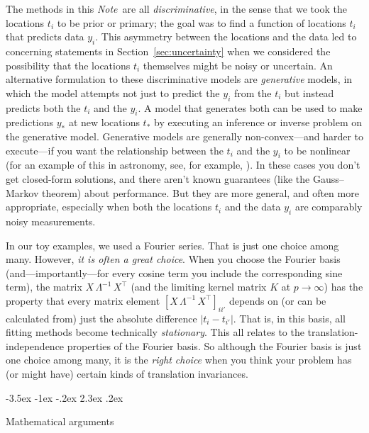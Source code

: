 \documentclass[12pt,letterpaper]{article}
\makeatletter
\renewcommand\section{\@startsection {section}{1}{\z@}%
  {-3.5ex \@plus -1ex \@minus -.2ex}%
  {2.3ex \@plus.2ex}%
  {\raggedright\normalfont\Large\bfseries}}
\newcommand{\documentname}{\textsl{Note}}
\newcommand{\sectionname}{Section}
\makeatother
\begin{document}
The methods in this \documentname\ are all \emph{discriminative}, in the sense that we took the locations $t_i$ to be prior or primary;
the goal was to find a function of locations $t_i$ that predicts data $y_i$.
This asymmetry between the locations and the data led to concerning statements in \sectionname~\ref{sec:uncertainty} when we considered the possibility that the locations $t_i$ themselves might be noisy or uncertain.
An alternative formulation to these discriminative models are \emph{generative} models, in which the model attempts not just to predict the $y_i$ from the $t_i$ but instead predicts both the $t_i$ and the $y_i$.
A model that generates both can be used to make predictions $y_\ast$ at new locations $t_\ast$ by executing an inference or inverse problem on the generative model.
Generative models are generally non-convex---and harder to execute---if you want the relationship between the $t_i$ and the $y_i$ to be nonlinear (for an example of this in astronomy, see, for example, \citealt{thecannon}).
In these cases you don't get closed-form solutions, and there aren't known guarantees (like the Gauss--Markov theorem) about performance.
But they are more general, and often more appropriate, especially when both the locations $t_i$ and the data $y_i$ are comparably noisy measurements.

In our toy examples, we used a Fourier series.
That is just one choice among many.
However, \emph{it is often a great choice}.
When you choose the Fourier basis (and---importantly---for every cosine term you include the corresponding sine term), the matrix $X\,\Lambda^{-1}\,X^\top$ (and the limiting kernel matrix $K$ at $p\rightarrow\infty$) has the property that every matrix element $[X\,\Lambda^{-1}\,X^\top]_{ii'}$ depends on (or can be calculated from) just the absolute difference $|t_i-t_{i'}|$.
That is, in this basis, all fitting methods become technically \emph{stationary}.
This all relates to the translation-independence properties of the Fourier basis.
So although the Fourier basis is just one choice among many, it is the \emph{right choice} when you think your problem has (or might have) certain kinds of translation invariances.


{\raggedright
\setlength{\bibsep}{0pt plus 0.3ex} %


}

\appendix
\section{Mathematical arguments}\label{app:math}
\end{document}
